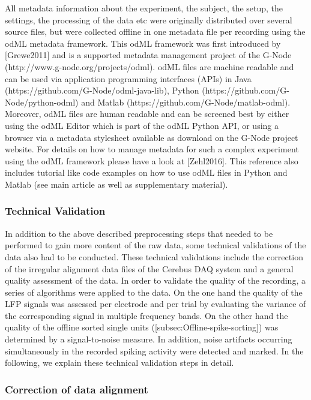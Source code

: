  All metadata information about the experiment, the subject, the setup, the settings, the processing of the data etc were originally distributed over several source files, but were collected offline in one metadata file per recording using the odML metadata framework. This odML framework was first introduced by [Grewe2011] and is a supported metadata management project of the G-Node (http://www.g-node.org/projects/odml). odML files are machine readable and can be used via application programming interfaces (APIs) in Java (https://github.com/G-Node/odml-java-lib), Python (https://github.com/G-Node/python-odml) and Matlab (https://github.com/G-Node/matlab-odml). Moreover, odML files are human readable and can be screened best by either using the odML Editor which is part of the odML Python API, or using a browser via a metadata stylesheet available as download on the G-Node project website. For details on how to manage metadata for such a complex experiment using the odML framework please have a look at [Zehl2016]. This reference also includes tutorial like code examples on how to use odML files in Python and Matlab (see main article as well as supplementary material).

\subsubsection{Technical Validation}

In addition to the above described preprocessing steps that needed to be performed to gain more content of the raw data, some technical validations of the data also had to be conducted. These technical validations include the correction of the irregular alignment data files of the Cerebus DAQ system and a general quality assessment of the data. In order to validate the quality of the recording, a series of algorithms were applied to the data. On the one hand the quality of the LFP signals was assessed per electrode and per trial by evaluating the variance of the corresponding signal in multiple frequency bands. On the other hand the quality of the offline sorted single units ([subsec:Offline-spike-sorting]) was determined by a signal-to-noise measure. In addition, noise artifacts occurring simultaneously in the recorded spiking activity were detected and marked. In the following, we explain these technical validation steps in detail.

\subsubsection{Correction of data alignment}

